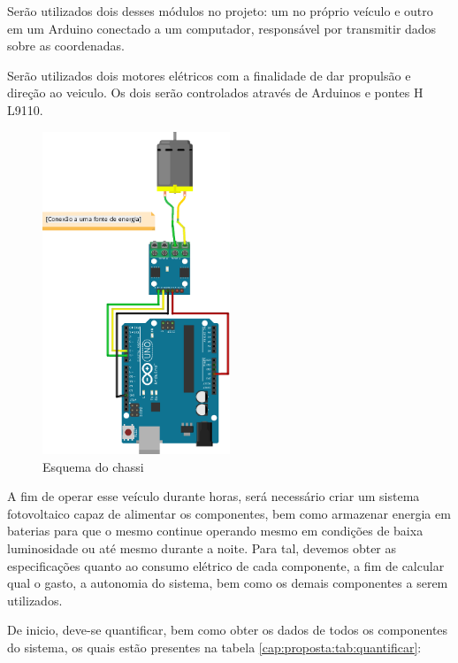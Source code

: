 Serão utilizados dois desses módulos no projeto: um no próprio veículo e outro em um Arduino conectado a um computador, responsável por transmitir dados sobre as coordenadas.

Serão utilizados dois motores elétricos com a finalidade de dar propulsão e direção ao veiculo. Os dois serão controlados através de Arduinos e pontes H L9110.

\begin{figure}[H]
    \centering
    \includegraphics[width=0.5\textwidth]{figuras/MOTORBB.png}
    \caption{Esquema do chassi}
    \label{fig:fritz:motor}
\end{figure}

A fim de operar esse veículo durante horas, será necessário criar um sistema fotovoltaico capaz de alimentar os componentes, bem como armazenar energia em baterias para que o mesmo continue operando mesmo em condições de baixa luminosidade ou até mesmo durante a noite. Para tal, devemos obter as especificações quanto ao consumo elétrico de cada componente, a fim de calcular qual o gasto, a autonomia do sistema, bem como os demais componentes a serem utilizados.

De inicio, deve-se quantificar, bem como obter os dados de todos os componentes do sistema, os quais estão presentes na tabela \ref{cap:proposta:tab:quantificar}:


